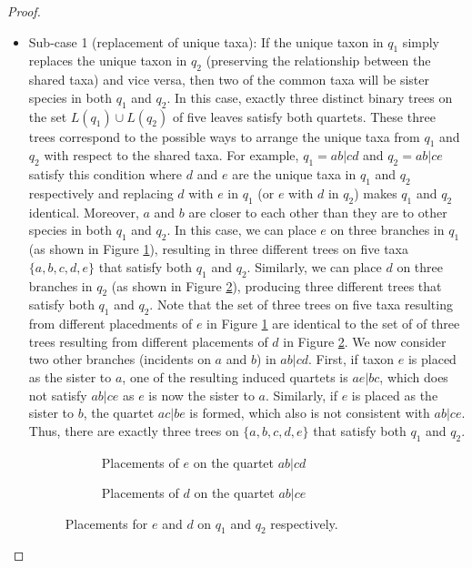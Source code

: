 \documentclass[10pt,a4paper]{article}
\begin{document}
\begin{proof}
\begin{itemize}
    \begin{itemize} 
        \item Sub-case 1 (replacement of unique taxa): If the unique taxon in $q_1$ simply replaces the unique taxon in $q_2$ (preserving the relationship between the shared taxa) and vice versa, then two of the common taxa will be sister species in both $q_1$ and $q_2$. In this case, exactly three distinct binary trees on the set $L(q_1)\cup L(q_2)$ of five leaves satisfy both quartets. These three trees correspond to the possible ways to arrange the unique taxa from $q_1$ and $q_2$ with respect to the shared taxa. For example, $q_1= ab|cd$ and $q_2= ab|ce$ satisfy this condition where $d$ and $e$ are the unique taxa in $q_1$ and $q_2$ respectively and replacing $d$ with $e$ in $q_1$ (or $e$ with $d$ in $q_2$) makes $q_1$ and $q_2$ identical. Moreover, $a$ and $b$ are closer to each other than they are to other species in both $q_1$ and $q_2$. In this case, we can place $e$ on three branches in $q_1$ (as shown in Figure \ref{fig:place_e}), resulting in three different trees on five taxa $\{a,b,c,d,e\}$ that satisfy both $q_1$ and $q_2$. Similarly, we can place $d$ on three branches in $q_2$ (as shown in Figure \ref{fig:place_d}), producing three different trees that satisfy both $q_1$ and $q_2$. Note that the set of three trees on five taxa resulting from different placedments of $e$ in Figure \ref{fig:place_e} are identical to the set of of three trees resulting from different placements of $d$ in Figure \ref{fig:place_d}. %
        We now consider two other branches (incidents on $a$ and $b$) in $ab|cd$. First, if taxon $e$ is placed as the sister to $a$, one of the resulting induced quartets is $ae|bc$, which does not satisfy $ab|ce$ as $e$ is now the sister to $a$. Similarly, if $e$ is placed as the sister to $b$, the quartet $ac|be$ is formed, which also is not consistent with $ab|ce$. Thus, there are exactly three trees on $\{a,b,c,d,e\}$ that satisfy both $q_1$ and $q_2$.
\begin{figure}[h]
    \centering
    \begin{subfigure}{0.45\textwidth}
        \centering
        \caption{Placements of $e$ on the quartet $ab|cd$}
        \label{fig:place_e}
    \end{subfigure}
    \hfill %
    \begin{subfigure}{0.45\textwidth}
        \centering
        \caption{Placements of $d$ on the quartet $ab|ce$}
        \label{fig:place_d}
    \end{subfigure}
    \caption{Placements for $e$ and $d$ on $q_1$ and $q_2$ respectively.}
    \label{fig:place_both}
\end{figure}


\end{itemize}
\end{itemize}
\end{proof}
\end{document}
